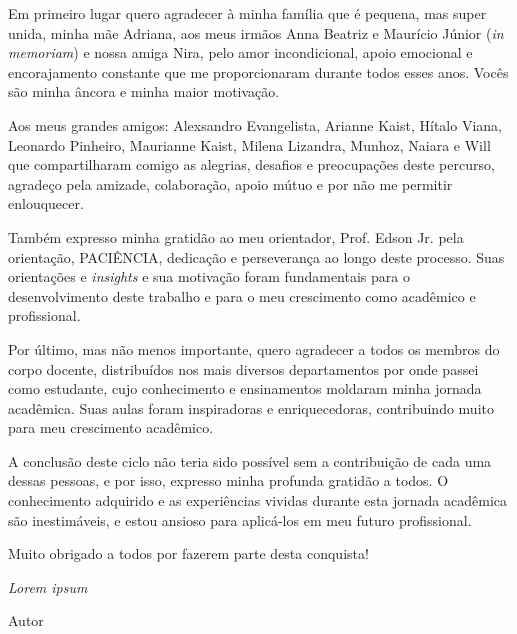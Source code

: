 \documentclass[
	12pt,			%
	openright,		%
	oneside,	
	a4paper,		%
	english,		%
	brazil			%
]{abntex2/abntex2}  %
\begin{document}
\begin{agradecimentos}

	Em primeiro lugar quero agradecer à minha família que é pequena, mas super unida, minha mãe Adriana, aos meus irmãos Anna Beatriz e Maurício Júnior (\textit{in memoriam}) e nossa amiga Nira, pelo amor incondicional, apoio emocional e encorajamento constante que me proporcionaram durante todos esses anos. Vocês são minha âncora e minha maior motivação.
	
	Aos meus grandes amigos: Alexsandro Evangelista, Arianne Kaist, Hítalo Viana, Leonardo Pinheiro, Maurianne Kaist, Milena Lizandra, Munhoz, Naiara e Will que compartilharam comigo as alegrias, desafios e preocupações deste percurso, agradeço pela amizade, colaboração, apoio mútuo e por não me permitir enlouquecer.
	
	Também expresso minha gratidão ao meu orientador, Prof. Edson Jr. pela orientação, PACIÊNCIA, dedicação e perseverança ao longo deste processo. Suas orientações e \textit{insights} e sua motivação foram fundamentais para o desenvolvimento deste trabalho e para o meu crescimento como acadêmico e profissional.
	
	Por último, mas não menos importante, quero agradecer a todos os membros do corpo docente, distribuídos nos mais diversos departamentos por onde passei como estudante, cujo conhecimento e ensinamentos moldaram minha jornada acadêmica. Suas aulas foram inspiradoras e enriquecedoras, contribuindo muito para meu crescimento acadêmico.
	
	A conclusão deste ciclo não teria sido possível sem a contribuição de cada uma dessas pessoas, e por isso, expresso minha profunda gratidão a todos. O conhecimento adquirido e as experiências vividas durante esta jornada acadêmica são inestimáveis, e estou ansioso para aplicá-los em meu futuro profissional.
	
	Muito obrigado a todos por fazerem parte desta conquista!

\end{agradecimentos}

\begin{epigrafe}
    \vspace*{\fill}
	\begin{flushright}
		\textit{Lorem ipsum}

		Autor
	\end{flushright}\vspace{4cm}
\end{epigrafe}
\end{document}
